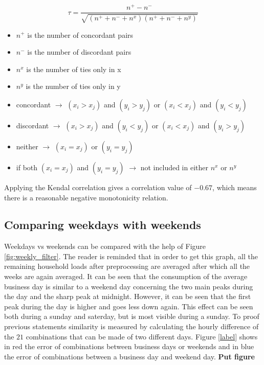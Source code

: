 \begin{equation}\label{eq:kendall}
	\tau = \frac{n^+-n^-}{\sqrt{(n^++n^-+n^x)(n^++n^-+n^y)}}
\end{equation}
\begin{itemize}
	\item $ n^+ $ is the number of concordant pairs
	\item $ n^- $ is the number of discordant pairs
	\item $ n^x $ is the number of ties only in x
	\item $ n^y $ is the number of ties only in y
	\item concordant $\rightarrow $ $ (x_i > x_j ) $ and $ (y_i > y_j ) $ or $ (x_i < x_j ) $ and $ (y_i < y_j ) $
	\item discordant $\rightarrow $ $ (x_i > x_j ) $ and $ (y_i < y_j ) $ or $ (x_i < x_j ) $ and $ (y_i > y_j ) $
	\item neither $\rightarrow $ $ (x_i = x_j ) $ or $ (y_i = y_j ) $
	\item if both $ (x_i = x_j ) $ and $ (y_i = y_j ) $ $\rightarrow $ not included in either $ n^x $ or $ n^y $
\end{itemize}

Applying the Kendal correlation  gives a correlation value of $ -0.67$, which means there is a reasonable negative monotonicity relation.\\



\subsection{Comparing weekdays with weekends} \label{s:Comparing weekdays with weekends}
Weekdays vs weekends can be compared with the help of Figure \ref{fig:weekly_filter}. The reader is reminded that in order to get this graph, all the remaining household loads after preprocessing are averaged after which all the weeks are again averaged. It can be seen that the consumption of the average business day is similar to a weekend day concerning the two main peaks during the day and the sharp peak at midnight. However, it can be seen that the first peak during the day is higher and goes less down again. This effect can be seen both during a sunday and saterday, but is most visible during a sunday. To proof previous statements similarity is measured by calculating the hourly difference of the $ 21 $ combinations that can be made of two different days. Figure \ref{label} shows in red the error of combinations between business days or weekends and in blue the error of combinations between a business day and weekend day.
\textbf{Put figure}




